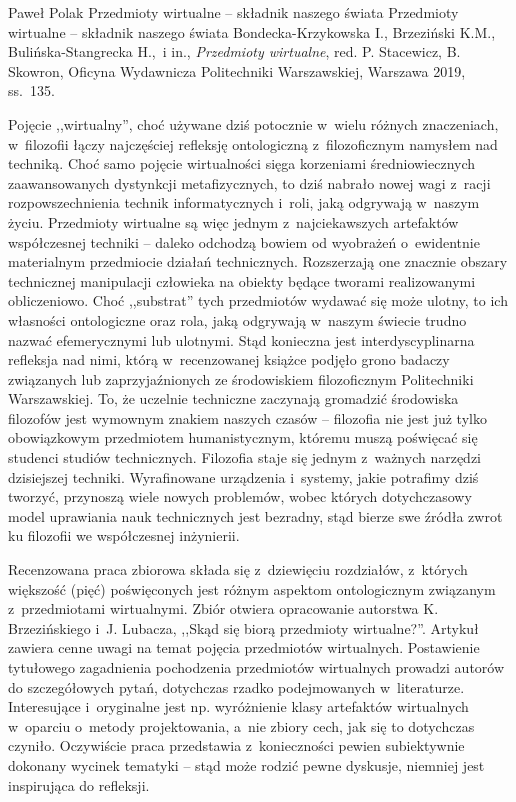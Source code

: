 \begin{recplenv}{Paweł Polak}
	{Przedmioty wirtualne -- składnik naszego świata}
	{Przedmioty wirtualne -- składnik naszego świata}
	{Bondecka-Krzykowska I., Brzeziński K.M., Bulińska-Stangrecka H.,~i in., \textit{Przedmioty wirtualne}, red. P. Stacewicz, B. Skowron, Oficyna Wydawnicza Politechniki Warszawskiej, Warszawa 2019, ss.~135.}






Pojęcie ,,wirtualny'', choć używane dziś potocznie w~wielu różnych znaczeniach, w~filozofii łączy najczęściej refleksję ontologiczną z~filozoficznym namysłem nad techniką. Choć samo pojęcie wirtualności sięga korzeniami średniowiecznych zaawansowanych dystynkcji metafizycznych, to dziś nabrało nowej wagi z~racji rozpowszechnienia technik informatycznych i~roli, jaką odgrywają w~naszym życiu. Przedmioty wirtualne są więc jednym z~najciekawszych artefaktów współczesnej techniki -- daleko odchodzą bowiem od wyobrażeń o~ewidentnie materialnym przedmiocie działań technicznych. Rozszerzają one znacznie obszary technicznej manipulacji człowieka na obiekty będące tworami realizowanymi obliczeniowo. Choć ,,substrat'' tych przedmiotów wydawać się może ulotny, to ich własności ontologiczne oraz rola, jaką odgrywają w~naszym świecie trudno nazwać efemerycznymi lub ulotnymi. Stąd konieczna jest interdyscyplinarna refleksja nad nimi, którą w~recenzowanej książce podjęło grono badaczy związanych lub zaprzyjaźnionych ze środowiskiem filozoficznym Politechniki Warszawskiej. To, że uczelnie techniczne zaczynają gromadzić środowiska filozofów jest wymownym znakiem naszych czasów -- filozofia nie jest już tylko obowiązkowym przedmiotem humanistycznym, któremu muszą poświęcać się studenci studiów technicznych. Filozofia staje się jednym z~ważnych narzędzi dzisiejszej techniki. Wyrafinowane urządzenia i~systemy, jakie potrafimy dziś tworzyć, przynoszą wiele nowych problemów, wobec których dotychczasowy model uprawiania nauk technicznych jest bezradny, stąd bierze swe źródła zwrot ku filozofii we współczesnej inżynierii.

Recenzowana praca zbiorowa składa się z~dziewięciu rozdziałów, z~których większość (pięć) poświęconych jest różnym aspektom ontologicznym związanym z~przedmiotami wirtualnymi. Zbiór otwiera opracowanie autorstwa K. Brzezińskiego i~J. Lubacza, ,,Skąd się biorą przedmioty wirtualne?''. Artykuł zawiera cenne uwagi na temat pojęcia przedmiotów wirtualnych. Postawienie tytułowego zagadnienia pochodzenia przedmiotów wirtualnych prowadzi autorów do szczegółowych pytań, dotychczas rzadko podejmowanych w~literaturze. Interesujące i~oryginalne jest np. wyróżnienie klasy artefaktów wirtualnych w~oparciu o~metody projektowania, a~nie zbiory cech, jak się to dotychczas czyniło. Oczywiście praca przedstawia z~konieczności pewien subiektywnie dokonany wycinek tematyki -- stąd może rodzić pewne dyskusje, niemniej jest inspirująca do refleksji.


\end{recplenv}

